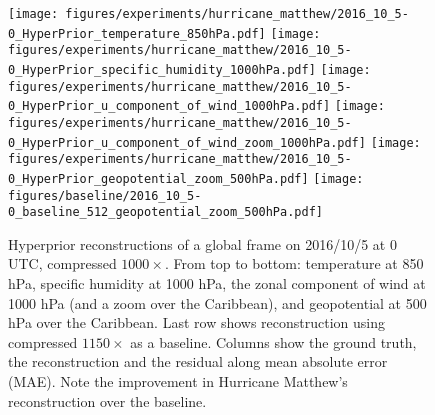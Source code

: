 \begin{figure}
    \begin{flushright}
    \texttt{[image: figures/experiments/hurricane\_matthew/2016\_10\_5-0\_HyperPrior\_temperature\_850hPa.pdf]}
    \texttt{[image: figures/experiments/hurricane\_matthew/2016\_10\_5-0\_HyperPrior\_specific\_humidity\_1000hPa.pdf]}
    \texttt{[image: figures/experiments/hurricane\_matthew/2016\_10\_5-0\_HyperPrior\_u\_component\_of\_wind\_1000hPa.pdf]}
    \texttt{[image: figures/experiments/hurricane\_matthew/2016\_10\_5-0\_HyperPrior\_u\_component\_of\_wind\_zoom\_1000hPa.pdf]}
    \texttt{[image: figures/experiments/hurricane\_matthew/2016\_10\_5-0\_HyperPrior\_geopotential\_zoom\_500hPa.pdf]}
    \texttt{[image: figures/baseline/2016\_10\_5-0\_baseline\_512\_geopotential\_zoom\_500hPa.pdf]}
    \caption{Hyperprior reconstructions of a global frame on 2016/10/5 at 0 UTC, compressed $1000\times$. From top to bottom: temperature at 850 hPa, specific humidity at 1000 hPa, the zonal component of wind at 1000 hPa (and a zoom over the Caribbean), and geopotential at 500 hPa over the Caribbean. Last row shows reconstruction using \citet{huang2022compressing} compressed $1150\times$ as a baseline. Columns show the ground truth, the reconstruction and the residual along mean absolute error (MAE). Note the improvement in Hurricane Matthew's reconstruction over the baseline.}
    \label{fig:hurricane_matthew_hyperprior}
    \end{flushright}
\end{figure}